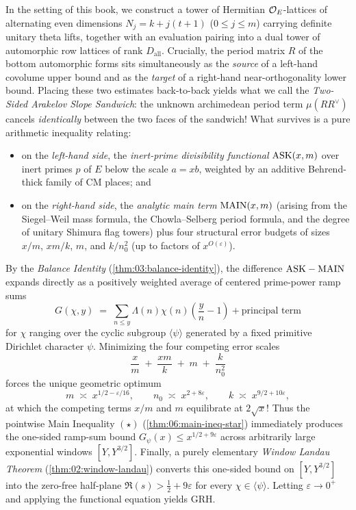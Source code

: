 In the setting of this book, we construct a tower of Hermitian $\mathcal{O}_E$-lattices of alternating even dimensions $N_j = k + j(t+1)$ ($0 \le j \le m$) carrying definite unitary theta lifts, together with an evaluation pairing into a dual tower of automorphic row lattices of rank $D_{\mathrm{all}}$. Crucially, the period matrix $R$ of the bottom automorphic forms sits simultaneously as the \emph{source} of a left-hand covolume upper bound and as the \emph{target} of a right-hand near-orthogonality lower bound. Placing these two estimates back-to-back yields what we call the \emph{Two-Sided Arakelov Slope Sandwich}: the unknown archimedean period term $\mu(R R^\vee)$ cancels \emph{identically} between the two faces of the sandwich! What survives is a pure arithmetic inequality relating:
\begin{itemize}
\item on the \emph{left-hand side}, the \emph{inert-prime divisibility functional} $\mathrm{ASK}(x, m)$ over inert primes $p$ of $E$ below the scale $a = x b$, weighted by an additive Behrend-thick family of CM places; and
\item on the \emph{right-hand side}, the \emph{analytic main term} $\mathrm{MAIN}(x, m)$ (arising from the Siegel--Weil mass formula, the Chowla--Selberg period formula, and the degree of unitary Shimura flag towers) plus four structural error budgets of sizes $x/m$, $x m / k$, $m$, and $k / n_0^2$ (up to factors of $x^{O(\varepsilon)}$).
\end{itemize}
By the \emph{Balance Identity} (\cref{thm:03:balance-identity}), the difference $\mathrm{ASK} - \mathrm{MAIN}$ expands directly as a positively weighted average of centered prime-power ramp sums
\[
  G(\chi, y) \;=\; \sum_{n \le y} \Lambda(n)\chi(n)\!\left(\frac{y}{n}-1\right) + \text{principal term}
\]
for $\chi$ ranging over the cyclic subgroup $\langle\psi\rangle$ generated by a fixed primitive Dirichlet character $\psi$. Minimizing the four competing error scales
\[
  \frac{x}{m} \;+\; \frac{x m}{k} \;+\; m \;+\; \frac{k}{n_0^2}
\]
forces the unique geometric optimum
\[
  m \;\asymp\; x^{1/2 - \varepsilon/16}, \qquad n_0 \;\asymp\; x^{2 + 8\varepsilon}, \qquad k \;\asymp\; x^{9/2 + 10\varepsilon},
\]
at which the competing terms $x/m$ and $m$ equilibrate at $2\sqrt{x}$! Thus the pointwise Main Inequality $(\star)$ (\cref{thm:06:main-ineq-star}) immediately produces the one-sided ramp-sum bound $G_\psi(x) \le x^{1/2 + 9\varepsilon}$ across arbitrarily large exponential windows $[Y, Y^{3/2}]$. Finally, a purely elementary \emph{Window Landau Theorem} (\cref{thm:02:window-landau}) converts this one-sided bound on $[Y, Y^{3/2}]$ into the zero-free half-plane $\Re(s) > \frac{1}{2} + 9\varepsilon$ for every $\chi \in \langle\psi\rangle$. Letting $\varepsilon \to 0^+$ and applying the functional equation yields GRH.

